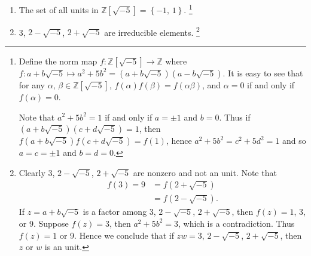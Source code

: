 \begin{note}
    \begin{enumerate}
        \item The set of all units in $\mathbb{Z}\left[\sqrt{-5}\right]=\left\{-1,\,1\right\}$.
        \footnote{
            Define the norm map $f:\mathbb{Z}\left[\sqrt{-5}\right]\rightarrow \mathbb{Z}$
            where $f:a+b\sqrt{-5}\mapsto a^2+5b^2=\left(a+b\sqrt{-5}\right)\left(a-b\sqrt{-5}\right)$.
            It is easy to see that for any $\alpha,\,\beta \in \mathbb{Z}\left[\sqrt{-5}\right]$,
            $f\left(\alpha\right)f\left(\beta\right)=f\left(\alpha\beta\right)$, and $\alpha=0$
            if and only if $f\left(\alpha\right)=0$. 

            Note that $a^2+5b^2=1$ if and only if $a=\pm 1$ and $b=0$. Thus if
            $\left(a+b\sqrt{-5}\right)\left(c+d\sqrt{-5}\right)=1$, then
            $f\left(a+b\sqrt{-5}\right)f\left(c+d\sqrt{-5}\right)=f\left(1\right)$, hence
            $a^2+5b^2=c^2+5d^2=1$ and so $a=c=\pm 1$ and $b=d=0$.
        }
        \item 3, $2-\sqrt{-5}$, $2+\sqrt{-5}$ are irreducible elements.
        \footnote{
            Clearly 3, $2-\sqrt{-5}$, $2+\sqrt{-5}$ are nonzero and not an unit. Note that
            \begin{align*}
                f\left(3\right) = 9 &= f\left(2+\sqrt{-5}\right) \\
                &= f\left(2-\sqrt{-5}\right).
            \end{align*}
            If $z=a+b\sqrt{-5}$ is a factor among 3, $2-\sqrt{-5}$, $2+\sqrt{-5}$,
            then $f\left(z\right)=1$, 3, or 9. Suppose $f\left(z\right)=3$, then
            $a^2+5b^2=3$, which is a contradiction. Thus $f\left(z\right)=1$ or 9.
            Hence we conclude that if $zw=3$, $2-\sqrt{-5}$, $2+\sqrt{-5}$, then
            $z$ or $w$ is an unit.
        }
    \end{enumerate}
\end{note}